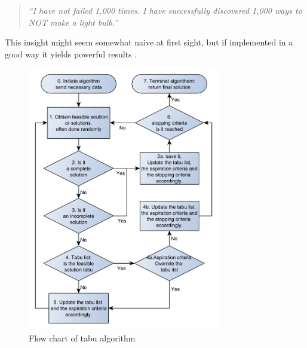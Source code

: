 \begin{quotation}
\emph{``I have not failed 1,000 times.  I have
successfully discovered 1,000 ways to NOT make a light bulb.''}
\end{quotation}
This insight might seem somewhat naive at first sight, but if implemented in a good way it yields powerful results \cite{canada}.
\begin{figure}[!h]
	\centering
	\includegraphics[width=0.75\textwidth,height=0.70\textheight]{chapter_4_methods/ny_generel}
  	\caption[Generic flow chart of tabu algorithm]
  	{Flow chart of tabu algorithm}
	\label{t1}
\end{figure}

